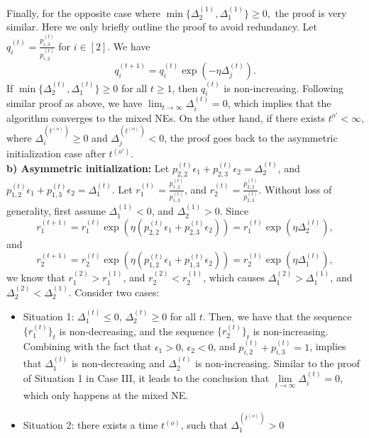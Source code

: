 Finally, for the opposite case where $\min\{\Delta^{(1)}_2,\Delta^{(1)}_1\}\geq 0,$ the proof is very similar. Here we only briefly outline the proof to avoid redundancy. Let $q_{i}^{(t)}=\frac{p_{i,3}^{(t)}}{p_{i,2}^{(t)}}$ for $i\in[2]$. We have 
$$ q^{(t+1)}_{i}= q^{(t)}_{i}\exp\left(-\eta\Delta_{j}^{(t)}\right).$$
If $\min\{\Delta^{(t)}_2,\Delta^{(t)}_1\}\geq 0$ for all $t\geq 1$, then $q_{i}^{(t)}$ is non-increasing. Following similar proof as above, we have $\lim_{t\rightarrow \infty}\Delta_{i}^{(t)}=0$, which implies that the algorithm converges to the mixed NEs. On the other hand, if there exists $t^{o'}<\infty$, where $\Delta_i^{(t^{(o)})}\geq 0$ and $\Delta_j^{(t^{(o)})}< 0$, the proof goes back to the asymmetric initialization case after $t^{(o')}$.\\

\noindent \textbf{b) Asymmetric initialization:}   Let $p^{(t)}_{2,2}\epsilon_1+p^{(t)}_{2,3}\epsilon_2=\Delta^{(t)}_2$, and $p^{(t)}_{1,2}\epsilon_1+p^{(t)}_{1,3}\epsilon_2=\Delta^{(t)}_1$. Let $r^{(t)}_1=\frac{p^{(t)}_{1,2}}{p^{(t)}_{1,3}}$, and $r^{(t)}_2=\frac{p^{(t)}_{2,2}}{p^{(t)}_{2,3}}$. Without loss of generality, first assume $\Delta_1^{(1)}<0$, and $\Delta_2^{(1)}>0$.  Since 
\[
  r_{1}^{(t+1)} = r_1^{(t)}\exp\left(\eta{\left(p^{(t)}_{2,2}\epsilon_1 + p^{(t)}_{2,3}\epsilon_2\right)}\right) = r_1^{(t)}\exp(\eta\Delta_2^{(t)}),
\]
and 
\[
  r_{2}^{(t+1)} = r_2^{(t)}\exp\left(\eta{\left(p^{(t)}_{1,2}\epsilon_1 + p^{(t)}_{1,3}\epsilon_2\right)}\right) = r_2^{(t)}\exp(\eta\Delta_1^{(t)}),
\]
we know that $r_1^{(2)}> r_1^{(1)}$, and  $r_2^{(2)}< r_2^{(1)}$, which causes $\Delta_1^{(2)}>\Delta_1^{(1)}$, and $\Delta_2^{(2)}<\Delta_2^{(1)}$. Consider two cases:
\begin{itemize}
    \item Situation 1: $\Delta_1^{(t)}\leq 0$, $\Delta_2^{(t)}\geq 0$ for all $t$. Then, we have that the sequence $\{r_1^{(t)}\}_{t}$ is non-decreasing, and the sequence $\{r_2^{(t)}\}_{t}$ is non-increasing. Combining with the fact that $\epsilon_1>0$, $\epsilon_2<0$, and $p_{i,2}^{(t)}+p_{i,3}^{(t)}=1$, implies that $\Delta_1^{(t)}$ is non-decreasing and $\Delta_2^{(t)}$ is non-increasing. Similar to the proof of Situation 1 in Case III, it leads to the conclusion that $\lim\limits_{t\rightarrow\infty}\Delta_{i}^{(t)}=0$, which only happens at the mixed NE. 
    \item Situation 2: there exists a time $t^{(o)}$, such that $\Delta_1^{(t^{(o)})}>0$
    
\end{itemize}


